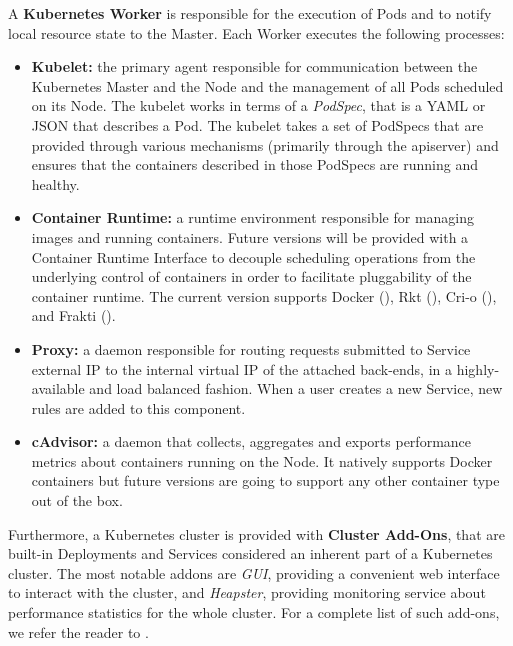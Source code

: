 A \textbf{Kubernetes Worker} is responsible for the execution of Pods and to notify local resource state to the Master.
%
Each Worker executes the following processes:
%
\begin{itemize}
	
	\item \textbf{Kubelet:} the primary agent responsible for communication between the Kubernetes Master and the Node and the management of all Pods scheduled on its Node.
	The kubelet works in terms of a \textit{PodSpec}, that is a YAML or JSON that describes a Pod.
	The kubelet takes a set of PodSpecs that are provided through various mechanisms (primarily through the apiserver) and ensures that the containers described in those PodSpecs are running and healthy.
	
	\item \textbf{Container Runtime:} a runtime environment responsible for managing images and running containers.
	Future versions will be provided with a Container Runtime Interface to decouple scheduling operations from the underlying control of containers in order to facilitate pluggability of the container runtime.
	The current version supports Docker (\cite{docker-web}), Rkt (\cite{rkt-web}), Cri-o (\cite{crio-web}), and Frakti (\cite{frakti-web}).
	
	\item \textbf{Proxy:} a daemon responsible for routing requests submitted to Service external IP to the internal virtual IP of the attached back-ends, in a highly-available and load balanced fashion.
	When a user creates a new Service, new rules are added to this component.
	
	\item \textbf{cAdvisor:} a daemon that collects, aggregates and exports performance metrics about containers running on the Node.
	It natively supports Docker containers but future versions are going to support any other container type out of the box.
	
\end{itemize}

Furthermore, a Kubernetes cluster is provided with \textbf{Cluster Add-Ons}, that are built-in Deployments and Services considered an inherent part of a Kubernetes cluster.
%
The most notable addons are \textit{GUI}, providing a convenient web interface to interact with the cluster, and \textit{Heapster}, providing monitoring service about performance statistics for the whole cluster.
%
For a complete list of such add-ons, we refer the reader to \cite{kubernetes-web}.

